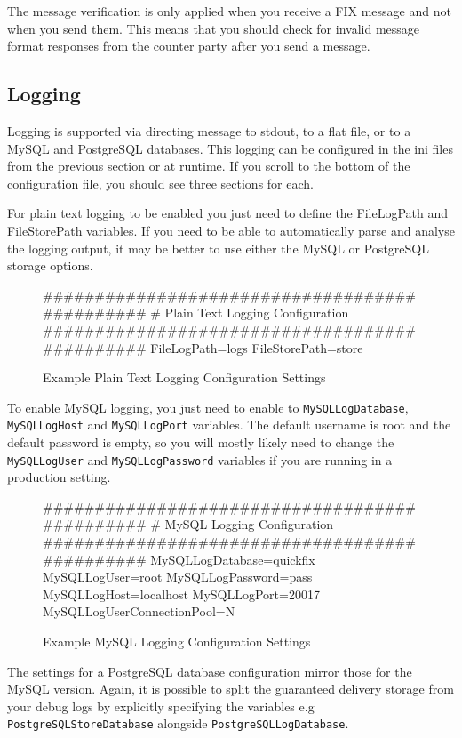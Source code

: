 The message verification is only applied when you receive a FIX message and not when
you send them. This means that you should check for invalid message format responses
from the counter party after you send a message.

\subsection{Logging}
Logging is supported via directing message to stdout, to a flat file, or to a MySQL and PostgreSQL databases. This logging can be configured in the ini files from the previous section or at runtime. If you scroll to the bottom of the configuration file, you should see three sections for each.

For plain text logging to be enabled you just need to define the FileLogPath and FileStorePath variables. If you need to be able to automatically parse and analyse the logging output, it may
be better to use either the MySQL or PostgreSQL storage options.

\begin{figure}[H]
\begin{inicode}
	##############################################
	#       Plain Text Logging Configuration 
	##############################################
	FileLogPath=logs
	FileStorePath=store
\end{inicode}
\caption{Example Plain Text Logging Configuration Settings}
\end{figure}

To enable MySQL logging, you just need to enable to \verb|MySQLLogDatabase|, \verb|MySQLLogHost| and \verb|MySQLLogPort| variables. The default username is root and the default password is empty, so you will mostly likely need to change the \verb|MySQLLogUser| and \verb|MySQLLogPassword| variables if you are running in a production setting.

\begin{figure}[H]
\begin{inicode}
	##############################################
	#       MySQL Logging Configuration 
	##############################################
	MySQLLogDatabase=quickfix
	MySQLLogUser=root
	MySQLLogPassword=pass
	MySQLLogHost=localhost
	MySQLLogPort=20017
	MySQLLogUserConnectionPool=N
\end{inicode}
\caption{Example MySQL Logging Configuration Settings}
\end{figure}

The settings for a PostgreSQL database configuration mirror those for the MySQL
version. Again, it is possible to split the guaranteed delivery storage from your
debug logs by explicitly specifying the variables e.g \verb|PostgreSQLStoreDatabase|
alongside \verb|PostgreSQLLogDatabase|.

